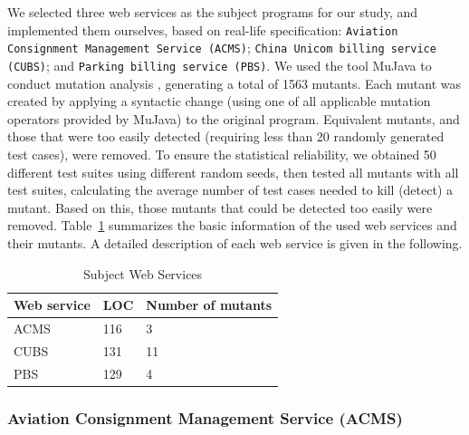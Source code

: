 \documentclass[10pt,journal,compsoc]{IEEEtran}
\begin{document}
We selected three web services as the subject programs for our study, and implemented them ourselves, based on real-life specification:
\texttt{Aviation Consignment Management Service (ACMS)};
\texttt{China Unicom billing service (CUBS)}; and
\texttt{Parking billing service (PBS)}. We used the tool MuJava \cite{ma2005mujava} to conduct mutation analysis \cite{demillo1978hints, chen2018test, mao2017out, chen2017similarity}, generating a total of 1563 mutants. Each mutant was created by applying a syntactic change (using one of all applicable mutation operators provided by MuJava) to the original program. Equivalent mutants, and those that were too easily detected
(requiring less than 20 randomly generated test cases), were removed.
To ensure the statistical reliability, we obtained 50 different test suites using different random seeds, then tested all mutants with all test suites, calculating the average number of test cases needed to kill (detect) a mutant. Based on this, those mutants that could be detected too easily were removed. Table~\ref{tab:objects} summarizes the basic information of the used web services and their mutants.
A detailed description of each web service is given in the following.

\begin{table}[h]
\caption{Subject Web Services}
\label{tab:objects}
\centering
\begin{tabular}{lll} \toprule
  Web service                            &LOC                            &Number of mutants    \\ \midrule
  ACMS                                   &116                            &3                                    \\
  CUBS                                   &131                            &11                                  \\
  PBS                                    &129                            &4                                   \\ \bottomrule
\end{tabular}

\end{table}

\subsubsection{Aviation Consignment Management Service (ACMS)}
\label{sec:acms}
\end{document}

